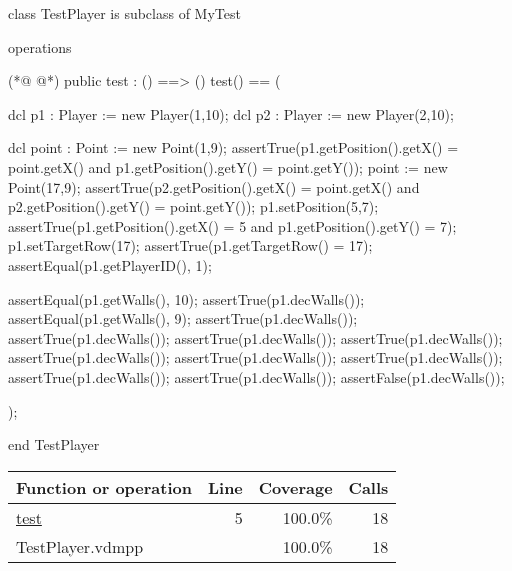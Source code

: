 \begin{vdmpp}[breaklines=true]
class TestPlayer is subclass of MyTest

operations

(*@
\label{test:5}
@*)
 public test : () ==> ()
 test() == 
 (
 
  dcl p1 : Player := new Player(1,10);
  dcl p2 : Player := new Player(2,10);
  
  dcl point : Point := new Point(1,9);
  assertTrue(p1.getPosition().getX() = point.getX() and p1.getPosition().getY() = point.getY());
  point := new Point(17,9);
  assertTrue(p2.getPosition().getX() = point.getX() and p2.getPosition().getY() = point.getY());
  p1.setPosition(5,7);
  assertTrue(p1.getPosition().getX() = 5 and p1.getPosition().getY() = 7);
  p1.setTargetRow(17);
  assertTrue(p1.getTargetRow() = 17);
  assertEqual(p1.getPlayerID(), 1);
  
  assertEqual(p1.getWalls(), 10);
  assertTrue(p1.decWalls());
  assertEqual(p1.getWalls(), 9);
  assertTrue(p1.decWalls());
  assertTrue(p1.decWalls());
  assertTrue(p1.decWalls());
  assertTrue(p1.decWalls());
  assertTrue(p1.decWalls());
  assertTrue(p1.decWalls());
  assertTrue(p1.decWalls());
  assertTrue(p1.decWalls());
  assertTrue(p1.decWalls());
  assertFalse(p1.decWalls());
  
 );

end TestPlayer
\end{vdmpp}
\bigskip
\begin{longtable}{|l|r|r|r|}
\hline
Function or operation & Line & Coverage & Calls \\
\hline
\hline
\hyperref[test:5]{test} & 5&100.0\% & 18 \\
\hline
\hline
TestPlayer.vdmpp & & 100.0\% & 18 \\
\hline
\end{longtable}

